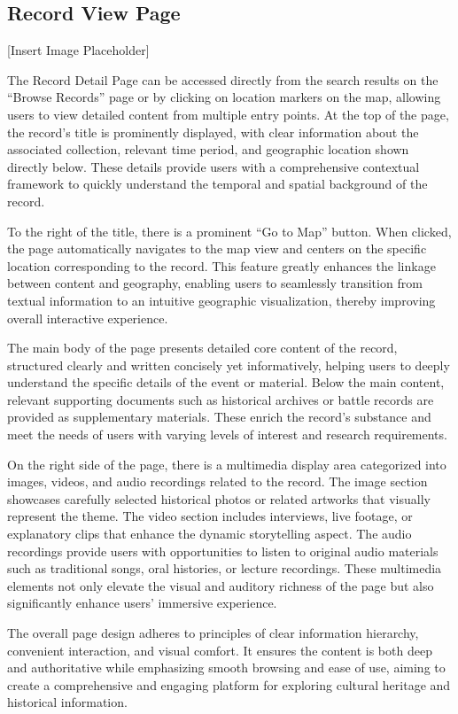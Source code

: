 \subsection{Record View Page}
[Insert Image Placeholder]

The Record Detail Page can be accessed directly from the search results on the “Browse Records” page or by clicking on location markers on the map, allowing users to view detailed content from multiple entry points. At the top of the page, the record’s title is prominently displayed, with clear information about the associated collection, relevant time period, and geographic location shown directly below. These details provide users with a comprehensive contextual framework to quickly understand the temporal and spatial background of the record.

To the right of the title, there is a prominent “Go to Map” button. When clicked, the page automatically navigates to the map view and centers on the specific location corresponding to the record. This feature greatly enhances the linkage between content and geography, enabling users to seamlessly transition from textual information to an intuitive geographic visualization, thereby improving overall interactive experience.

The main body of the page presents detailed core content of the record, structured clearly and written concisely yet informatively, helping users to deeply understand the specific details of the event or material. Below the main content, relevant supporting documents such as historical archives or battle records are provided as supplementary materials. These enrich the record’s substance and meet the needs of users with varying levels of interest and research requirements.

On the right side of the page, there is a multimedia display area categorized into images, videos, and audio recordings related to the record. The image section showcases carefully selected historical photos or related artworks that visually represent the theme. The video section includes interviews, live footage, or explanatory clips that enhance the dynamic storytelling aspect. The audio recordings provide users with opportunities to listen to original audio materials such as traditional songs, oral histories, or lecture recordings. These multimedia elements not only elevate the visual and auditory richness of the page but also significantly enhance users’ immersive experience.

The overall page design adheres to principles of clear information hierarchy, convenient interaction, and visual comfort. It ensures the content is both deep and authoritative while emphasizing smooth browsing and ease of use, aiming to create a comprehensive and engaging platform for exploring cultural heritage and historical information.

